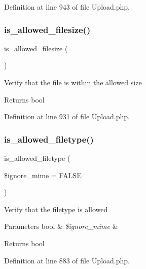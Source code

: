 Definition at line 943 of file Upload.\+php.

\mbox{\label{class_c_i___upload_aa1283241c3b2fc700c7b577beecd5f97}} 
\subsubsection{\texorpdfstring{is\_allowed\_filesize()}{is\_allowed\_filesize()}}
{\footnotesize\ttfamily is\+\_\+allowed\+\_\+filesize (\begin{DoxyParamCaption}{ }\end{DoxyParamCaption})}

Verify that the file is within the allowed size

\begin{DoxyReturn}{Returns}
bool 
\end{DoxyReturn}


Definition at line 931 of file Upload.\+php.

\mbox{\label{class_c_i___upload_a248e8cef69fc954953dc988e8d82afca}} 
\subsubsection{\texorpdfstring{is\_allowed\_filetype()}{is\_allowed\_filetype()}}
{\footnotesize\ttfamily is\+\_\+allowed\+\_\+filetype (\begin{DoxyParamCaption}\item[{}]{\$ignore\+\_\+mime = {\ttfamily FALSE} }\end{DoxyParamCaption})}

Verify that the filetype is allowed


\begin{DoxyParams}[1]{Parameters}
bool & {\em \$ignore\+\_\+mime} & \\
\hline
\end{DoxyParams}
\begin{DoxyReturn}{Returns}
bool 
\end{DoxyReturn}


Definition at line 883 of file Upload.\+php.

\mbox{\label{class_c_i___upload_af6f513bc693e3ba836f23fe9bebc6427}} 
